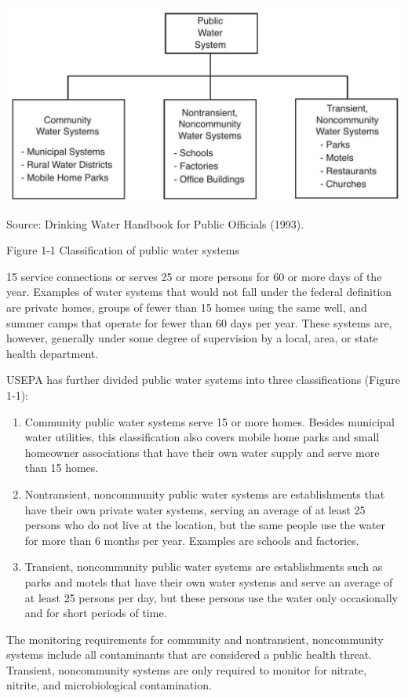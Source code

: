 \documentclass[10pt]{article}
\begin{document}
\includegraphics[max width=\textwidth]{2022_09_17_867b38c7c364bb842283g-03}

Source: Drinking Water Handbook for Public Officials (1993).

Figure 1-1 Classification of public water systems

15 service connections or serves 25 or more persons for 60 or more days of the year. Examples of water systems that would not fall under the federal definition are private homes, groups of fewer than 15 homes using the same well, and summer camps that operate for fewer than 60 days per year. These systems are, however, generally under some degree of supervision by a local, area, or state health department.

USEPA has further divided public water systems into three classifications (Figure 1-1):

\begin{enumerate}
  \item Community public water systems serve 15 or more homes. Besides municipal water utilities, this classification also covers mobile home parks and small homeowner associations that have their own water supply and serve more than 15 homes.

  \item Nontransient, noncommunity public water systems are establishments that have their own private water systems, serving an average of at least 25 persons who do not live at the location, but the same people use the water for more than 6 months per year. Examples are schools and factories.

  \item Transient, noncommunity public water systems are establishments such as parks and motels that have their own water systems and serve an average of at least 25 persons per day, but these persons use the water only occasionally and for short periods of time.

\end{enumerate}
The monitoring requirements for community and nontransient, noncommunity systems include all contaminants that are considered a public health threat. Transient, noncommunity systems are only required to monitor for nitrate, nitrite, and microbiological contamination.
\end{document}
